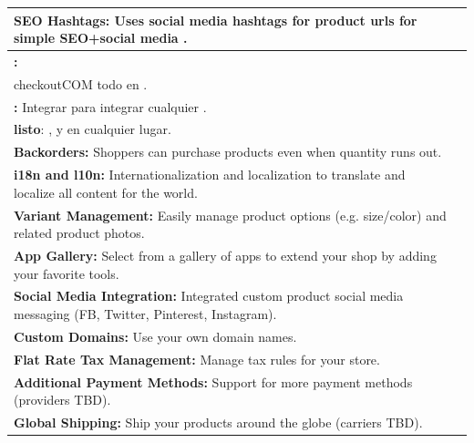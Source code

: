 \begin{table}[h!]
\begin{tabular}{ |L{0.6\paperwidth}|L{0.1\paperwidth}|}
\\ \hline
	\textbf{ SEO Hashtags:} Uses social media hashtags for product urls for simple SEO+social media \tracking.&
	
\\ \hline
	\textbf{ \onepage \checkoutCOM:} \\checkoutCOM todo en \onepage.&
	
\\ \hline
	\textbf{ \shop \analytics:} Integrar \tracking \framework para integrar cualquier \analytics \system.&
	
\\ \hline
	\textbf{ \dockerio listo}: \build, \ship y \run en cualquier lugar.&
	
\\ \hline
	 \textbf{ Backorders:} Shoppers can purchase products even when quantity runs out.&
	
\\ \hline
	\textbf{ i18n and l10n:} Internationalization and localization to translate and localize all content for the world.&
	
\\ \hline
	\textbf{ Variant Management:} Easily manage product options (e.g. size/color) and related product photos.&
	
\\ \hline
	\textbf{ App Gallery:} Select from a gallery of apps to extend your shop by adding your favorite tools.&
	
\\ \hline
	\textbf{ Social Media Integration:} Integrated custom product social media messaging (FB, Twitter, Pinterest, Instagram).&
	
\\ \hline
	\textbf{ Custom Domains:} Use your own domain names.&
	
\\ \hline
	\textbf{ Flat Rate Tax Management:} Manage tax rules for your store.&
	
\\ \hline
	\textbf{ Additional Payment Methods:} Support for more payment methods (providers TBD).&
	
\\ \hline
	\textbf{ Global Shipping:} Ship your products around the globe (carriers TBD).&
	

\end{tabular}
\end{table}
